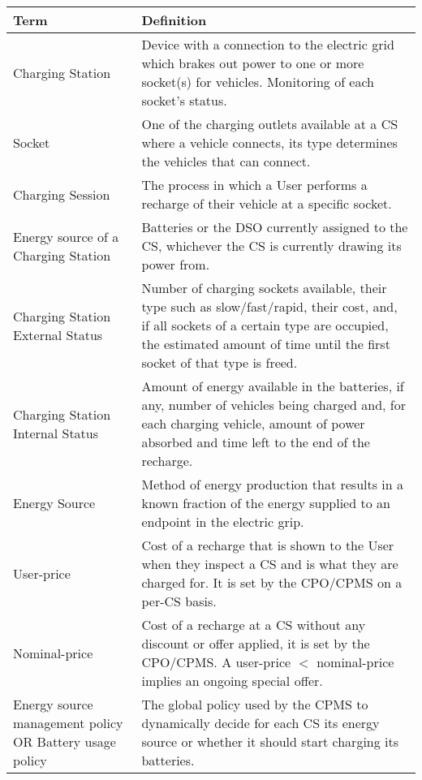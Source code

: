 \documentclass[11pt]{article}
\begin{document}
\begin{table}[H]
    \centering
    \setlength{\tabcolsep}{18pt}
    \renewcommand{\arraystretch}{1.2}
    \begin{tabularx}{\textwidth}{|>{\centering\hsize=0.4\hsize}X|>{\hsize=1.6\hsize}X|}
        \hline
        \textbf{Term} & \textbf{Definition} \\
        \hline
        Charging Station & Device with a connection to the electric grid which brakes out power to one or more socket(s) for vehicles. Monitoring of each socket's status. \\
        \hline
        Socket & One of the charging outlets available at a CS where a vehicle connects, its type determines the vehicles that can connect. \\
        \hline
        Charging Session & The process in which a User performs a recharge of their vehicle at a specific socket. \\
        \hline
        Energy source of a Charging Station & Batteries or the DSO currently assigned to the CS, whichever the CS is currently drawing its power from. \\
        \hline
        Charging Station External Status & Number of charging sockets available, their type such as slow/fast/rapid, their cost, and, if all sockets of a certain type are occupied, the estimated amount of time until the first socket of that type is freed. \\
        \hline
        Charging Station Internal Status & Amount of energy available in the batteries, if any, number of vehicles being charged and, for each charging vehicle, amount of power absorbed and time left to the end of the recharge. \\
        \hline
        Energy Source & Method of energy production that results in a known fraction of the energy supplied to an endpoint in the electric grip. \\
        \hline
        User-price & Cost of a recharge that is shown to the User when they inspect a CS and is what they are charged for. It is set by the CPO/CPMS on a per-CS basis.\\
        \hline
        Nominal-price & Cost of a recharge at a CS without any discount or offer applied, it is set by the CPO/CPMS. A user-price $<$ nominal-price implies an ongoing special offer. \\
        \hline
        Energy source management policy OR Battery usage policy & The global policy used by the CPMS to dynamically decide for each CS its energy source or whether it should start charging its batteries. \\
        \hline
    \end{tabularx}
    \label{tab:definitions}
\end{table}
\end{document}
